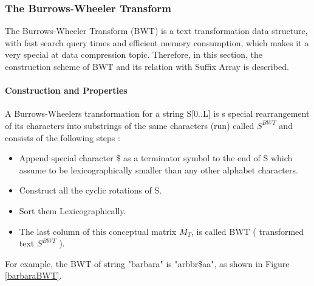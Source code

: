 \documentclass[11pt,a4paper]{report}
\begin{document}
\subsubsection{The Burrows-Wheeler Transform} 
\label{The Burrows-Wheeler Transform}


The Burrows-Wheeler Transform (BWT) is a text transformation data structure, 
with fast search query times and efficient memory consumption, which makes 
it a very special at data compression topic.
Therefore, in this section, the construction scheme of BWT and its relation 
with Suffix Array is described.\\





\paragraph{Construction and Properties}

A Burrows-Wheelers transformation for a string S[0..L] is s special rearrangement 
of its characters into substrings of the same characters (run) called $S^{BWT}$ 
and consists of the following steps \cite{bwt}:

\begin{itemize} 
	\item Append special character \$ as a terminator symbol to the end of S 
	which assume to be lexicographically smaller than any other alphabet 
	characters.
	\item  Construct all the cyclic rotations of S.
	\item  Sort them Lexicographically.
	\item The last column of this conceptual matrix \emph{$M_{T}$}, is called 
	BWT ( transformed text $S^{BWT}$ ).
\end{itemize}


For example, the BWT of string "barbara" is "arbbr\$aa", as shown in Figure 
\ref{barbaraBWT}.\\
\end{document}
